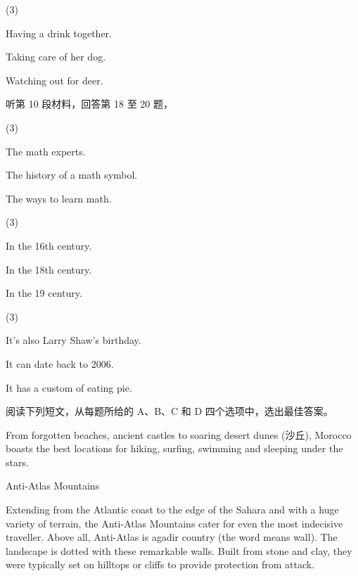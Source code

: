 \documentclass{英语试卷}
\begin{document}
\begin{choices}(3)
  \item Having a drink together.
  \item Taking care of her dog.
  \item Watching out for deer.
\end{choices}
\par 听第 10 段材料，回答第 18 至 20 题，\par
{}
\begin{choices}(3)
  \item The math experts.
  \item The history of a math symbol.
  \item The ways to learn math.
\end{choices}
\begin{choices}(3)
  \item In the 16th century.
  \item In the 18th century.
  \item In the 19 century.
\end{choices}
\begin{choices}(3)
  \item It's also Larry Shaw's birthday.
  \item It can date back to 2006.
  \item It has a custom of eating pie.
\end{choices}
\par 阅读下列短文，从每题所给的 A、B、C 和 D 四个选项中，选出最佳答案。\par
{}
\par From forgotten beaches, ancient castles to soaring desert dunes (沙丘), Morocco boasts the best locations for hiking, surfing, swimming and sleeping under the stars.\par
\par Anti-Atlas Mountains\par
\par Extending from the Atlantic coast to the edge of the Sahara and with a huge variety of terrain, the Anti-Atlas Mountains cater for even the most indecisive traveller. Above all, Anti-Atlas is agadir country (the word means wall). The landscape is dotted with these remarkable walls. Built from stone and clay, they were typically set on hilltops or cliffs to provide protection from attack.\par
\end{document}
